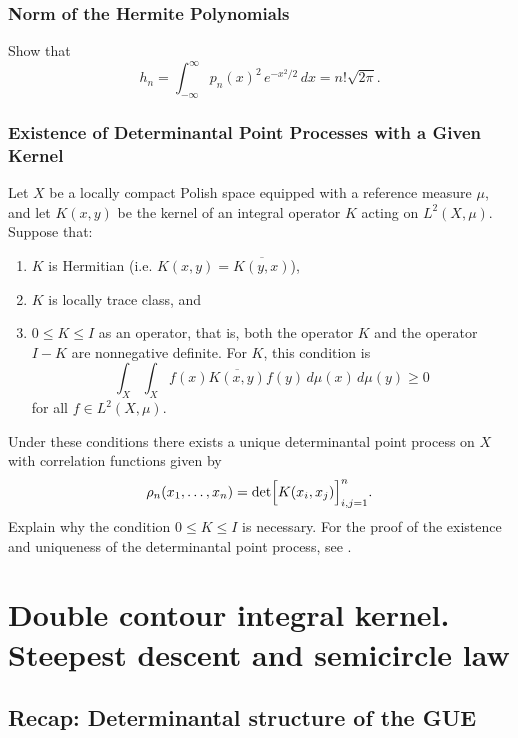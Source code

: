 \documentclass[letterpaper,11pt,oneside,reqno]{book}
\numberwithin{equation}{chapter}  %
\theoremstyle{definition}
\begin{document}
\subsection{Norm of the Hermite Polynomials}
\label{lecture5:prob:norm}

Show that
\begin{equation*}
	h_n=\int_{-\infty}^{\infty} p_n(x)^2\,e^{-x^2/2}\,dx=n!\sqrt{2\pi}.
\end{equation*}




\subsection{Existence of Determinantal Point Processes with a Given Kernel}
Let \(X\) be a locally compact Polish space equipped with a reference measure \(\mu\), and let \(K(x,y)\) be the kernel of an integral operator \(K\) acting on \(L^2(X,\mu)\). Suppose that:
\begin{enumerate}
	\item \(K\) is Hermitian (i.e. \(K(x,y)=\overline{K(y,x)}\)),
	\item \(K\) is locally trace class, and
	\item \(0\le K\le I\) as an operator, that is, both the operator \(K\) and the operator \(I-K\) are nonnegative definite. For $K$, this condition is
	\[
	\int_X\int_X f(x)\overline{K(x,y)}f(y)\,d\mu(x)\,d\mu(y)\ge0
	\]
	for all \(f\in L^2(X,\mu)\).
\end{enumerate}
Under these conditions there exists a unique determinantal point process on \(X\) with correlation functions given by
\[
\rho_n(x_1,\dots,x_n)=\det\Bigl[K(x_i,x_j)\Bigr]_{i,j=1}^n.
\]
Explain why the condition \(0\le K\le I\) is necessary.
For the proof of the existence and uniqueness of the determinantal point process, see \cite{Soshnikov2000}.













\chapter{Double contour integral kernel. Steepest descent and semicircle law}
\label{chap:lecture6}





\section{Recap: Determinantal structure of the GUE}
\end{document}
